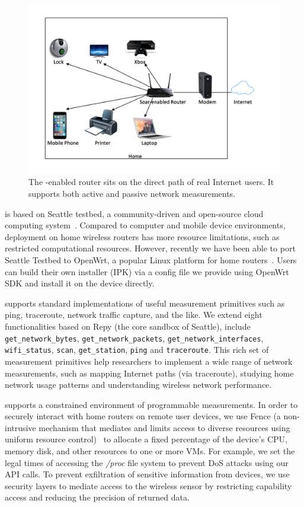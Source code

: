 \begin{figure}%
\centering
\includegraphics[width=0.8\columnwidth]{figure/home-network.png}
\caption{The \sysname-enabled router sits on the direct path of real 
Internet users. It supports both active and passive network measurements.}
\label{figure:design}
\end{figure}


\sysname is based on Seattle testbed, a community-driven and open-source cloud computing system~\cite{zhuang2013experience,cappos2009seattle}. Compared to computer and mobile device environments, deployment on home wireless routers has more resource limitations, such as restricted computational resources. However, recently we have been able to port Seattle Testbed to OpenWrt, a popular Linux platform for home routers~\cite{openwrt}. Users can build their own \sysname installer (IPK) via a config file we provide using OpenWrt SDK and install it on the device directly. 

\sysname supports standard implementations of useful measurement primitives such as ping, traceroute, network traffic capture, and the like. We extend eight functionalities based on Repy (the core sandbox of Seattle), include \texttt{get\_network\_bytes}, \texttt{get\_network\_packets}, \texttt{get\_network\_interfaces}, \texttt{wifi\_status}, \texttt{scan}, \texttt{get\_station}, \texttt{ping} and \texttt{traceroute}. This rich set of measurement primitives help researchers to implement a wide range of network measurements, such as mapping Internet paths (via traceroute), studying home network usage patterns and understanding wireless network performance.

\sysname supports a constrained environment of programmable measurements. In order to securely interact with home routers on remote user devices, we use Fence (a non-intrusive mechanism that mediates and limits access to diverse resources using uniform resource control)~\cite{li2015fence} to allocate a fixed percentage of the device's CPU, memory disk, and other resources to one or more VMs. For example, we set the legal times of accessing the \emph{/proc} file system to prevent DoS attacks using our API calls. To prevent exfiltration of sensitive information from devices, we use security layers to mediate access to the wireless sensor by restricting capability access and reducing the precision of returned data. 


